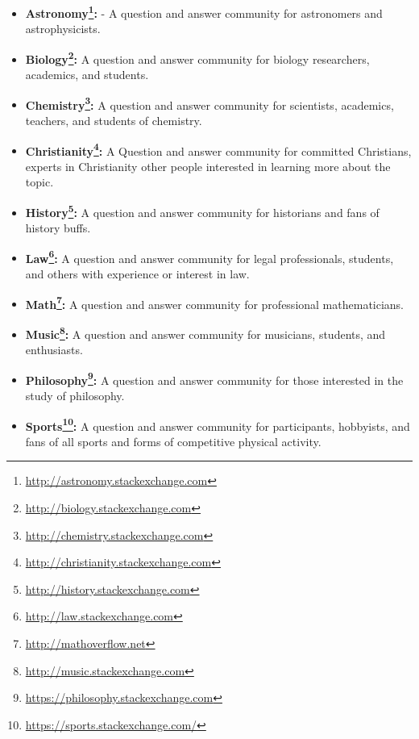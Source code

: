 \begin{itemize}
\item \textbf{Astronomy\footnote{\url{http://astronomy.stackexchange.com}}:} - A question and answer community for astronomers and astrophysicists. 

\item \textbf{Biology\footnote{\url{http://biology.stackexchange.com}}:} A question and answer community for biology researchers, academics, and students.

\item \textbf{Chemistry\footnote{\url{http://chemistry.stackexchange.com}}:} A question and answer community for scientists, academics, teachers, and students of chemistry.

\item \textbf{Christianity\footnote{\url{http://christianity.stackexchange.com}}:} A Question and answer community for committed Christians, experts in Christianity other people interested in learning more about the topic.

\item \textbf{History\footnote{\url{http://history.stackexchange.com}}:} A question and answer community for historians and fans of history buffs.

\item \textbf{Law\footnote{\url{http://law.stackexchange.com}}:} A question and answer community for legal professionals, students, and others with experience or interest in law.

\item \textbf{Math\footnote{\url{http://mathoverflow.net}}:} A question and answer community for professional mathematicians.

\item \textbf{Music\footnote{\url{http://music.stackexchange.com}}:}  A question and answer community for musicians, students, and enthusiasts. 

\item \textbf{Philosophy\footnote{\url{https://philosophy.stackexchange.com}}:}  A question and answer community for those interested in the study of philosophy.

\item \textbf{Sports\footnote{\url{https://sports.stackexchange.com/}}:} A question and answer community for participants, hobbyists, and fans of all sports and forms of competitive physical activity.
    
\end{itemize}


